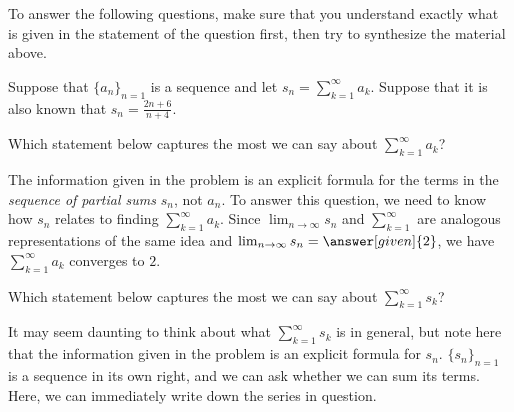 \documentclass{ximera}
\begin{document}
To answer the following questions, make sure that you understand exactly what is given in the statement of the question first, then try to synthesize the material above.

\begin{example}
Suppose that $\{a_n\}_{n=1}$ is a sequence and let $s_n = \sum_{k=1}^{\infty} a_k$.  Suppose that it is also known that $s_n = \frac{2n+6}{n+4}$.

\begin{question}
Which statement below captures the most we can say about $\sum_{k=1}^{\infty} a_k$? 

\begin{multipleChoice}
\end{multipleChoice}

\begin{feedback}
The information given in the problem is an explicit formula for the terms in the \emph{sequence of partial sums} $s_n$, not $a_n$.  To answer this question, we need to know how $s_n$ relates to finding $\sum_{k=1}^{\infty} a_k$.  Since $\lim_{n \to \infty} s_n$ and $\sum_{k=1}^{\infty}$ are analogous representations of the same idea and $\lim_{n \to \infty} s_n = \answer[given]{2}$, we have $\sum_{k=1}^{\infty} a_k$ converges to $2$. 
\end{feedback}
\end{question}
\begin{question}
Which statement below captures the most we can say about $\sum_{k=1}^{\infty} s_k$? 

\begin{multipleChoice}
\end{multipleChoice}

\begin{feedback}
It may seem daunting to think about what $\sum_{k=1}^{\infty} s_k$ is in general, but note here that the information given in the problem is an explicit formula for $s_n$.  $\{s_n\}_{n=1}$ is a sequence in its own right, and we can ask whether we can sum its terms.  Here, we can immediately write down the series in question.


\end{feedback}
\end{question}
\end{example}
\end{document}
